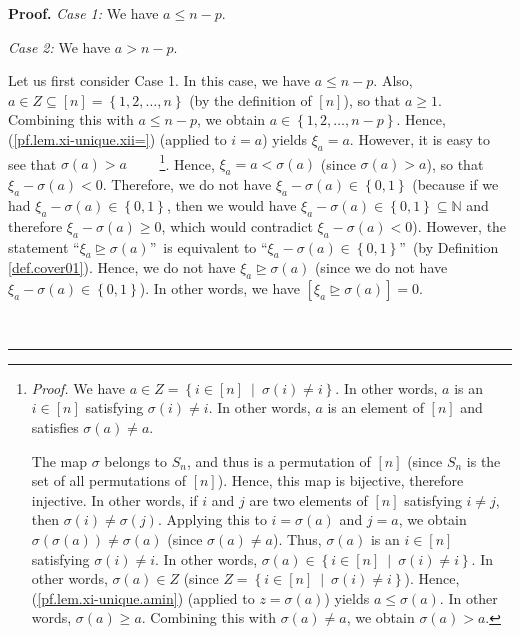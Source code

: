 \documentclass
[numbers=enddot,12pt,final,onecolumn,notitlepage,english]{scrartcl}%
\theoremstyle{definition}
\newenvironment{proof}[1][Proof]{\noindent\textbf{#1.} }{\ \rule{0.5em}{0.5em}}
\newenvironment{verlong}{}{}
\begin{document}
\begin{verlong}
\begin{proof}
\textit{Case 1:} We have $a\leq n-p$.

\textit{Case 2:} We have $a>n-p$.

Let us first consider Case 1. In this case, we have $a\leq n-p$. Also, $a\in
Z\subseteq\left[  n\right]  =\left\{  1,2,\ldots,n\right\}  $ (by the
definition of $\left[  n\right]  $), so that $a\geq1$. Combining this with
$a\leq n-p$, we obtain $a\in\left\{  1,2,\ldots,n-p\right\}  $. Hence,
(\ref{pf.lem.xi-unique.xii=}) (applied to $i=a$) yields $\xi_{a}=a$. However,
it is easy to see that $\sigma\left(  a\right)  >a$%
\ \ \ \ \footnote{\textit{Proof.} We have $a\in Z=\left\{  i\in\left[
n\right]  \ \mid\ \sigma\left(  i\right)  \neq i\right\}  $. In other words,
$a$ is an $i\in\left[  n\right]  $ satisfying $\sigma\left(  i\right)  \neq
i$. In other words, $a$ is an element of $\left[  n\right]  $ and satisfies
$\sigma\left(  a\right)  \neq a$.
\par
The map $\sigma$ belongs to $S_{n}$, and thus is a permutation of $\left[
n\right]  $ (since $S_{n}$ is the set of all permutations of $\left[
n\right]  $). Hence, this map is bijective, therefore injective. In other
words, if $i$ and $j$ are two elements of $\left[  n\right]  $ satisfying
$i\neq j$, then $\sigma\left(  i\right)  \neq\sigma\left(  j\right)  $.
Applying this to $i=\sigma\left(  a\right)  $ and $j=a$, we obtain
$\sigma\left(  \sigma\left(  a\right)  \right)  \neq\sigma\left(  a\right)  $
(since $\sigma\left(  a\right)  \neq a$). Thus, $\sigma\left(  a\right)  $ is
an $i\in\left[  n\right]  $ satisfying $\sigma\left(  i\right)  \neq i$. In
other words, $\sigma\left(  a\right)  \in\left\{  i\in\left[  n\right]
\ \mid\ \sigma\left(  i\right)  \neq i\right\}  $. In other words,
$\sigma\left(  a\right)  \in Z$ (since $Z=\left\{  i\in\left[  n\right]
\ \mid\ \sigma\left(  i\right)  \neq i\right\}  $). Hence,
(\ref{pf.lem.xi-unique.amin}) (applied to $z=\sigma\left(  a\right)  $) yields
$a\leq\sigma\left(  a\right)  $. In other words, $\sigma\left(  a\right)  \geq
a$. Combining this with $\sigma\left(  a\right)  \neq a$, we obtain
$\sigma\left(  a\right)  >a$.}. Hence, $\xi_{a}=a<\sigma\left(  a\right)  $
(since $\sigma\left(  a\right)  >a$), so that $\xi_{a}-\sigma\left(  a\right)
<0$. Therefore, we do not have $\xi_{a}-\sigma\left(  a\right)  \in\left\{
0,1\right\}  $ (because if we had $\xi_{a}-\sigma\left(  a\right)  \in\left\{
0,1\right\}  $, then we would have $\xi_{a}-\sigma\left(  a\right)
\in\left\{  0,1\right\}  \subseteq\mathbb{N}$ and therefore $\xi_{a}%
-\sigma\left(  a\right)  \geq0$, which would contradict $\xi_{a}-\sigma\left(
a\right)  <0$). However, the statement \textquotedblleft$\xi_{a}%
\trianglerighteq\sigma\left(  a\right)  $\textquotedblright\ is equivalent to
\textquotedblleft$\xi_{a}-\sigma\left(  a\right)  \in\left\{  0,1\right\}
$\textquotedblright\ (by Definition \ref{def.cover01}). Hence, we do not have
$\xi_{a}\trianglerighteq\sigma\left(  a\right)  $ (since we do not have
$\xi_{a}-\sigma\left(  a\right)  \in\left\{  0,1\right\}  $). In other words,
we have $\left[  \xi_{a}\trianglerighteq\sigma\left(  a\right)  \right]  =0$.


\end{proof}
\end{verlong}
\end{document}
